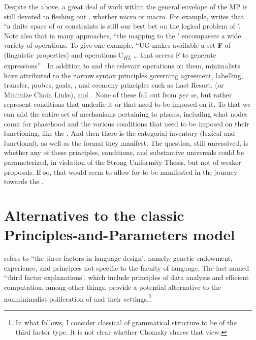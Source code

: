 \documentclass[output=paper,
modfonts
]{LSP/langsci}
\begin{document}
Despite the above, a great deal of work within the general envelope of
the MP is still devoted to fleshing out , whether micro or
macro. For example, \citet[202--203]{yang2011n} writes that ``a finite space of
 or constraints is still our best bet on the logical problem
of '. Note also that in many approaches, ``the
mapping to the ' encompasses a wide variety of operations. To
give one example, ``UG makes available a set \textbf{F} of 
(linguistic properties) and operations C\emph{\textsubscript{HL}}
\ldots{} that access F to generate expressions'' \citep[100]{chomsky2000}. In
addition to  and the relevant operations on them, minimalists
have attributed to the narrow syntax principles governing agreement,
labelling, transfer, probes, goals, , and economy principles
such as Last Resort,  (or Minimize Chain Links),
and . None of these fall out from  \emph{per se}, but
rather represent conditions that underlie it or that need to be imposed
on it. To that we can add the entire set of mechanisms pertaining to
phases, including what nodes count for phasehood and the various
conditions that need to be imposed on their functioning, like the . And then there is the categorial inventory
(lexical and functional), as well as the formal  they manifest.
The question, still unresolved, is whether any of these principles,
conditions, and substantive universals could be parameterized, in
violation of the Strong Uniformity Thesis, but not of weaker proposals.
If so, that would seem to allow for  to be
manifested in the journey towards the .

\section{Alternatives to the classic Principles-and-Parameters model}\label{sec:newmeyer:7}

\largerpage[-3]
\citet{chomsky2005} refers to ``the three factors in language design', namely,
genetic endowment, experience, and principles not specific to the
faculty of language. The last-named ``third factor explanations', which
include principles of data analysis and efficient computation, among
other things, provide a potential alternative to the nonminimalist
poliferation of  and their settings.\footnote{In what follows,
  I consider classical  of grammatical structure
  to be of the third factor type. It is not clear whether Chomsky shares
  that view.}
\end{document}
